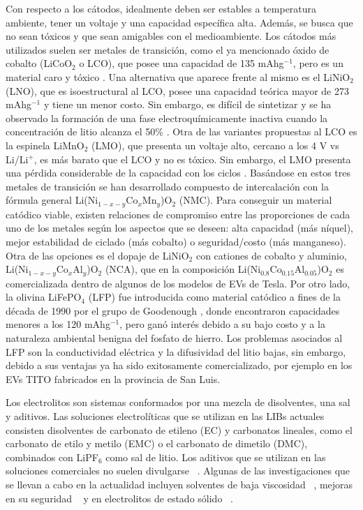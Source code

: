Con respecto a los cátodos, idealmente deben ser estables a temperatura ambiente,
tener un voltaje y una capacidad específica alta. Además, se busca que no sean 
tóxicos y que sean amigables con el medioambiente. Los cátodos más utilizados 
suelen ser metales de transición, como el ya mencionado óxido de cobalto 
(LiCoO$_2$ o LCO), que posee una capacidad de 135 mAhg$^{-1}$, pero es un
material caro y tóxico \cite{akhilash2021}. Una alternativa que aparece frente
al mismo es el LiNiO$_2$ (LNO), que es isoestructural al LCO, posee una
capacidad teórica mayor de 273 mAhg$^{-1}$ y tiene un menor costo. Sin embargo, es
difícil de sintetizar y se ha observado la formación de una fase 
electroquímicamente inactiva cuando la concentración de litio alcanza el 50\% 
\cite{bianchini2019}. Otra de las variantes propuestas al LCO es la espinela
LiMnO$_2$ (LMO), que presenta un voltaje alto, cercano a los 4 V vs Li/Li$^+$,
es más barato que el LCO y no es tóxico. Sin embargo, el LMO presenta una 
pérdida considerable de la capacidad con los ciclos \cite{bhandari2016}. Basándose en estos 
tres metales de transición se han desarrollado compuesto de intercalación con 
la fórmula general Li(Ni$_{1-x-y}$Co$_x$Mn$_y$)O$_2$ (NMC). Para conseguir un 
material catódico viable, existen relaciones de compromiso entre las proporciones de cada uno de 
los metales según los aspectos que se deseen: alta capacidad (más níquel), 
mejor estabilidad de ciclado (más cobalto) o seguridad/costo (más manganeso). 
Otra de las opciones es el dopaje de LiNiO$_2$ con cationes de cobalto y aluminio, 
Li(Ni$_{1-x-y}$Co$_x$Al$_y$)O$_2$ (NCA), que en la composición 
Li(Ni$_{0.8}$Co$_{0.15}$Al$_{0.05}$)O$_2$ \cite{chen2004} es comercializada 
dentro de algunos de los modelos de EVs de Tesla. Por otro lado, la olivina 
LiFePO$_4$ (LFP) fue introducida como material catódico a fines de la década 
de 1990 por el grupo de Goodenough \cite{padhi1997}, donde encontraron capacidades
menores a los 120 mAhg$^{-1}$, pero ganó interés debido a su bajo costo y a la 
naturaleza ambiental benigna del fosfato de hierro. Los problemas asociados al LFP son la
conductividad eléctrica y la difusividad del litio bajas, sin embargo, debido
a sus ventajas ya ha sido exitosamente comercializado, por ejemplo en los EVs 
TITO fabricados en la provincia de San Luis.

Los electrolitos son sistemas conformados por una mezcla de disolventes, una 
sal y aditivos. Las soluciones electrolíticas que se utilizan en las LIBs actuales 
consisten disolventes de carbonato de etileno (EC) y carbonatos lineales, como
el carbonato de etilo y metilo (EMC) o el carbonato de dimetilo (DMC), combinados 
con LiPF$_6$ como sal de litio. Los aditivos que se utilizan en las soluciones 
comerciales no suelen divulgarse ~\cite{schipper2016}. Algunas de las 
investigaciones que se llevan a cabo en la actualidad incluyen solventes de
baja viscosidad ~\cite{logan2020}, mejoras en su seguridad ~\cite{wang2019} 
y en electrolitos de estado sólido ~\cite{zheng2018}.

